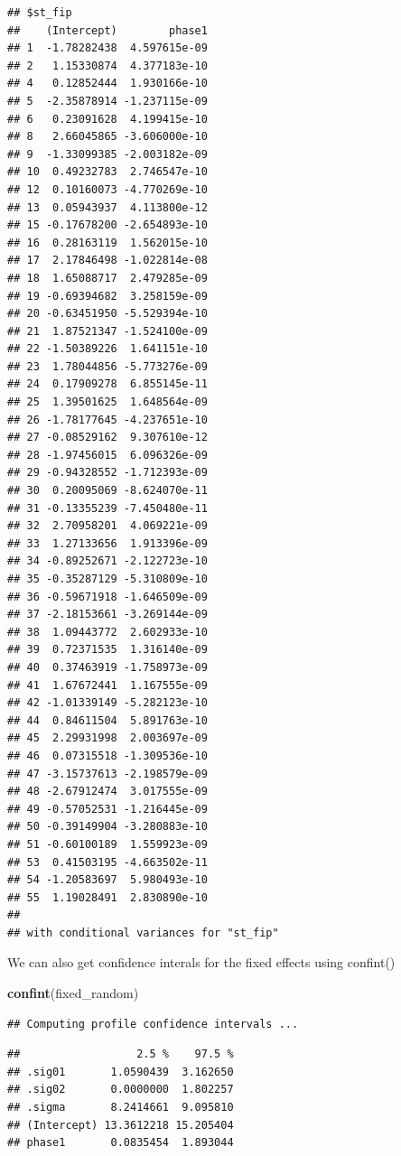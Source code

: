 \documentclass[]{book}
\newenvironment{Shaded}{\begin{snugshade}}{\end{snugshade}}
\newcommand{\KeywordTok}[1]{\textcolor[rgb]{0.13,0.29,0.53}{\textbf{#1}}}
\newcommand{\NormalTok}[1]{#1}
\begin{document}
\begin{verbatim}
## $st_fip
##    (Intercept)        phase1
## 1  -1.78282438  4.597615e-09
## 2   1.15330874  4.377183e-10
## 4   0.12852444  1.930166e-10
## 5  -2.35878914 -1.237115e-09
## 6   0.23091628  4.199415e-10
## 8   2.66045865 -3.606000e-10
## 9  -1.33099385 -2.003182e-09
## 10  0.49232783  2.746547e-10
## 12  0.10160073 -4.770269e-10
## 13  0.05943937  4.113800e-12
## 15 -0.17678200 -2.654893e-10
## 16  0.28163119  1.562015e-10
## 17  2.17846498 -1.022814e-08
## 18  1.65088717  2.479285e-09
## 19 -0.69394682  3.258159e-09
## 20 -0.63451950 -5.529394e-10
## 21  1.87521347 -1.524100e-09
## 22 -1.50389226  1.641151e-10
## 23  1.78044856 -5.773276e-09
## 24  0.17909278  6.855145e-11
## 25  1.39501625  1.648564e-09
## 26 -1.78177645 -4.237651e-10
## 27 -0.08529162  9.307610e-12
## 28 -1.97456015  6.096326e-09
## 29 -0.94328552 -1.712393e-09
## 30  0.20095069 -8.624070e-11
## 31 -0.13355239 -7.450480e-11
## 32  2.70958201  4.069221e-09
## 33  1.27133656  1.913396e-09
## 34 -0.89252671 -2.122723e-10
## 35 -0.35287129 -5.310809e-10
## 36 -0.59671918 -1.646509e-09
## 37 -2.18153661 -3.269144e-09
## 38  1.09443772  2.602933e-10
## 39  0.72371535  1.316140e-09
## 40  0.37463919 -1.758973e-09
## 41  1.67672441  1.167555e-09
## 42 -1.01339149 -5.282123e-10
## 44  0.84611504  5.891763e-10
## 45  2.29931998  2.003697e-09
## 46  0.07315518 -1.309536e-10
## 47 -3.15737613 -2.198579e-09
## 48 -2.67912474  3.017555e-09
## 49 -0.57052531 -1.216445e-09
## 50 -0.39149904 -3.280883e-10
## 51 -0.60100189  1.559923e-09
## 53  0.41503195 -4.663502e-11
## 54 -1.20583697  5.980493e-10
## 55  1.19028491  2.830890e-10
## 
## with conditional variances for "st_fip"
\end{verbatim}

We can also get confidence interals for the fixed effects using
confint()

\begin{Shaded}
\begin{Highlighting}[]
\KeywordTok{confint}\NormalTok{(fixed_random)}
\end{Highlighting}
\end{Shaded}

\begin{verbatim}
## Computing profile confidence intervals ...
\end{verbatim}

\begin{verbatim}
##                  2.5 %    97.5 %
## .sig01       1.0590439  3.162650
## .sig02       0.0000000  1.802257
## .sigma       8.2414661  9.095810
## (Intercept) 13.3612218 15.205404
## phase1       0.0835454  1.893044
\end{verbatim}
\end{document}
